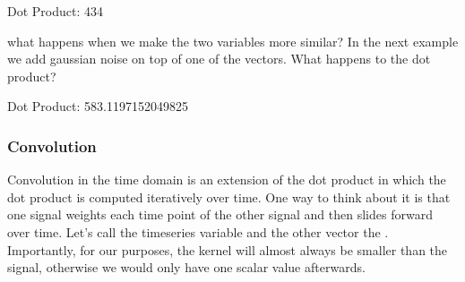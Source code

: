 \documentclass[letterpaper,10pt,english]{sphinxmanual}
\begin{document}
\begin{sphinxVerbatim}[commandchars=\\\{\}]
Dot Product: 434
\end{sphinxVerbatim}

\noindent{}

what happens when we make the two variables more similar?  In the next example we add gaussian noise on top of one of the vectors.  What happens to the dot product?

\begin{sphinxVerbatim}[commandchars=\\\{\}]
    
 
 
 

\end{sphinxVerbatim}

\begin{sphinxVerbatim}[commandchars=\\\{\}]
Dot Product: 583.1197152049825
\end{sphinxVerbatim}

\noindent{}


\subsubsection{Convolution}
\label{\detokenize{content/Signal_Processing:convolution}}
Convolution in the time domain is an extension of the dot product in which the dot product is computed iteratively over time.  One way to think about it is that one signal weights each time point of the other signal and then slides forward over time.  Let’s call the timeseries variable  and the other vector the . Importantly, for our purposes, the kernel will almost always be smaller than the signal, otherwise we would only have one scalar value afterwards.
\end{document}
